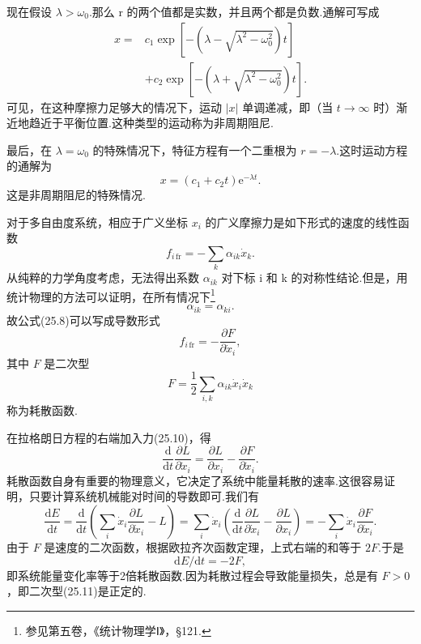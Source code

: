 现在假设 $\lambda>\omega_0$.那么 r 的两个值都是实数，并且两个都是负数.通解可写成
\begin{equation}
\begin{split}
  x={}&c_1\exp\left[-\left(\lambda-\sqrt{\lambda^2-\omega_0^2}\right)t\right]\\
  &+c_2\exp\left[-\left(\lambda+\sqrt{\lambda^2-\omega_0^2}\right)t\right].
\end{split}
\end{equation}
可见，在这种摩擦力足够大的情况下，运动 $|x|$ 单调递减，即（当 $t\to\infty$ 时）渐近地趋近于平衡位置.这种类型的运动称为非周期阻尼.

最后，在 $\lambda=\omega_0$ 的特殊情况下，特征方程有一个二重根为 $r=-\lambda$.这时运动方程的通解为
\begin{equation}
  x=\left(c_1+c_2t\right)\mathrm{e}^{-\lambda t}.
\end{equation}
这是非周期阻尼的特殊情况.

对于多自由度系统，相应于广义坐标 $x_i$ 的广义摩擦力是如下形式的速度的线性函数
\begin{equation}
  f_{i\,\mathrm{fr}}=-\sum_k\alpha_{ik}\dot{x}_k.
\end{equation}
从纯粹的力学角度考虑，无法得出系数 $\alpha_{ik}$ 对下标 i 和 k 的对称性结论.但是，用统计物理的方法可以证明，在所有情况下\footnote{参见第五卷，《统计物理学Ⅰ》，§121.}
\begin{equation}
  \alpha_{ik}=\alpha_{ki}.
\end{equation}
故公式(25.8)可以写成导数形式
\begin{equation}
  f_{i\,\mathrm{fr}}=-\frac{\partial F}{\partial\dot{x}_i},
\end{equation}
其中 $F$ 是二次型
\begin{equation}
  F=\frac{1}{2}\sum_{i,k}\alpha_{ik}\dot{x}_i\dot{x}_k
\end{equation}
称为耗散函数.

在拉格朗日方程的右端加入力(25.10)，得
\begin{equation}
  \frac{\mathrm{d}}{\mathrm{d}t}\frac{\partial L}{\partial\dot{x}_i}
  =\frac{\partial L}{\partial x_i}-\frac{\partial F}{\partial\dot{x}_i}.
\end{equation}
耗散函数自身有重要的物理意义，它决定了系统中能量耗散的速率.这很容易证明，只要计算系统机械能对时间的导数即可.我们有
\begin{equation*}
  \frac{\mathrm{d}E}{\mathrm{d}t}
  =\frac{\mathrm{d}}{\mathrm{d}t}\left(\sum_i\dot{x}_i\frac{\partial L}{\partial\dot{x}_i}-L\right)
  =\sum_i\dot{x}_i\left(\frac{\mathrm{d}}{\mathrm{d}t}\frac{\partial L}{\partial\dot{x}_i}
  -\frac{\partial L}{\partial x_i}\right)
  =-\sum_i\dot{x}_i\frac{\partial F}{\partial\dot{x}_i}.
\end{equation*}
由于 $F$ 是速度的二次函数，根据欧拉齐次函数定理，上式右端的和等于 $2F$.于是
\begin{equation}
  \mathrm{d}E/\mathrm{d}t=-2F,
\end{equation}
即系统能量变化率等于2倍耗散函数.因为耗散过程会导致能量损失，总是有 $F>0$，即二次型(25.11)是正定的.

